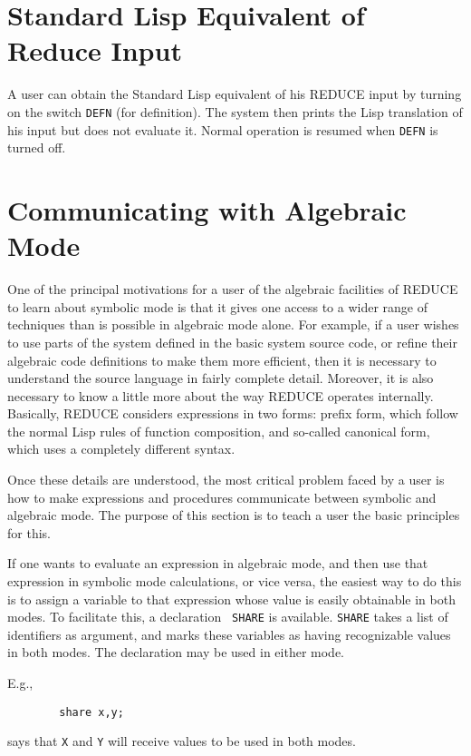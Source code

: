 \documentclass[11pt,letterpaper]{book}
\makeatletter
\newcommand{\REDUCE}{REDUCE}
\newcommand{\underscore}{\_}
\newcommand{\ttindex}[1]{{\renewcommand{\_}{\protect\underscore}%
                          \index{#1@{\tt #1}}}}
\makeatother
\begin{document}
\section{Standard Lisp Equivalent of Reduce Input}

A user can obtain the Standard Lisp equivalent of his {\REDUCE} input by
turning on the switch {\tt DEFN}\ttindex{DEFN} (for definition).  The
system then prints the Lisp translation of his input but does not evaluate
it.  Normal operation is resumed when {\tt DEFN} is turned off.

\section{Communicating with Algebraic Mode}

One of the principal motivations for a user of the algebraic facilities of
{\REDUCE} to learn about symbolic mode is that it
gives one access to a wider range of techniques than is possible in
algebraic mode alone.  For example, if a user
wishes to use parts of the system defined in the basic system source code,
or refine their algebraic code definitions to make them more efficient,
then it is necessary to understand the source language in fairly complete
detail.  Moreover, it is also necessary to know a little more about the
way {\REDUCE} operates internally.  Basically, {\REDUCE} considers
expressions in two forms: prefix form, which follow the normal Lisp rules
of function composition, and so-called canonical form, which uses a
completely different syntax.

Once these details are understood, the most critical problem faced by a
user is how to make expressions and procedures communicate between symbolic
and algebraic mode. The purpose of this section is to teach a user the
basic principles for this.

If one wants to evaluate an expression in algebraic mode, and then use
that expression in symbolic mode calculations, or vice versa, the easiest
way to do this is to assign a variable to that expression whose value is
easily obtainable in both modes.  To facilitate this, a declaration {\tt
SHARE}\ttindex{SHARE} is available. {\tt SHARE} takes a list of
identifiers as argument, and marks these variables as having recognizable
values in both modes.  The declaration may be used in either mode.

E.g.,
{\small\begin{verbatim}
        share x,y;
\end{verbatim}}
says that {\tt X} and {\tt Y} will receive values to be used in both modes.
\end{document}
